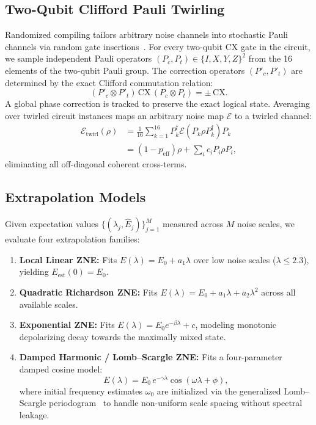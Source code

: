 \subsection{Two-Qubit Clifford Pauli Twirling}
Randomized compiling tailors arbitrary noise channels into stochastic Pauli channels via random gate insertions~\cite{wallman2016}. For every two-qubit $\mathrm{CX}$ gate in the circuit, we sample independent Pauli operators $(P_c, P_t) \in \{I, X, Y, Z\}^2$ from the 16 elements of the two-qubit Pauli group. The correction operators $(P'_c, P'_t)$ are determined by the exact Clifford commutation relation:
\begin{equation}
(P'_c \otimes P'_t)\,\mathrm{CX}\,(P_c \otimes P_t) = \pm\,\mathrm{CX}.
\label{eq:pauli_twirl}
\end{equation}
A global phase correction is tracked to preserve the exact logical state. Averaging over twirled circuit instances maps an arbitrary noise map $\mathcal{E}$ to a twirled channel:
\begin{align}
\mathcal{E}_{\mathrm{twirl}}(\rho) &= \frac{1}{16} \sum_{k=1}^{16} P_k^\dagger \mathcal{E}(P_k \rho P_k^\dagger) P_k \nonumber \\
&= (1-p_{\mathrm{eff}})\rho + \sum_{i} c_i P_i \rho P_i,
\end{align}
eliminating all off-diagonal coherent cross-terms.

\subsection{Extrapolation Models}
Given expectation values $\{(\lambda_j, \hat{E}_j)\}_{j=1}^M$ measured across $M$ noise scales, we evaluate four extrapolation families:
\begin{enumerate}
    \item \textbf{Local Linear ZNE:} Fits $E(\lambda) = E_0 + a_1 \lambda$ over low noise scales ($\lambda \le 2.3$), yielding $E_{\mathrm{est}}(0) = E_0$.
    \item \textbf{Quadratic Richardson ZNE:} Fits $E(\lambda) = E_0 + a_1 \lambda + a_2 \lambda^2$ across all available scales.
    \item \textbf{Exponential ZNE:} Fits $E(\lambda) = E_0 e^{-\beta \lambda} + c$, modeling monotonic depolarizing decay towards the maximally mixed state.
    \item \textbf{Damped Harmonic / Lomb--Scargle ZNE:} Fits a four-parameter damped cosine model:
    \begin{equation}
    E(\lambda) = E_0 \, e^{-\gamma \lambda} \cos(\omega \lambda + \phi),
    \label{eq:harmonic_model}
    \end{equation}
    where initial frequency estimates $\omega_0$ are initialized via the generalized Lomb--Scargle periodogram~\cite{scargle1982} to handle non-uniform scale spacing without spectral leakage.
\end{enumerate}

